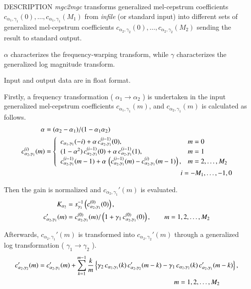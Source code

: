\begin{qsection}{DESCRIPTION}
{\em mgc2mgc} transforms generalized mel-cepstrum coefficients
$c_{\alpha_1,\gamma_1}(0),\dots,c_{\alpha_1,\gamma_1}(M_1)$
from {\em infile} (or standard input) 
into different sets of generalized mel-cepstrum coefficients
$c_{\alpha_2,\gamma_2}(0),\dots,c_{\alpha_2,\gamma_2}(M_2)$
sending the result to standard output.

$\alpha$ characterizes the frequency-warping transform,
while $\gamma$ characterizes the generalized log magnitude transform.

Input and output data are in float format.

Firstly, a frequency transformation ( $\alpha_1 \rightarrow \alpha_2$ )
is undertaken in the input generalized mel-cepstrum
coefficients $c_{\alpha_1,\gamma_1}(m)$,
and $c_{\alpha_2,\gamma_1}(m)$ is calculated as follows.
\begin{align} 
\alpha &= (\alpha_2-\alpha_1)/(1-\alpha_1\alpha_2) \notag \\
c_{\alpha_2,\gamma_1}^{(i)}(m) &= \begin{cases}
          \;\; c_{\alpha_1,\gamma_1}(-i)
	    +\alpha\,c_{\alpha_2,\gamma_1}^{(i-1)}(0), &  m=0 \\
          \;\; (1-\alpha^2)\,c_{\alpha_2,\gamma_1}^{(i-1)}(0)
            +\alpha\,c_{\alpha_2,\gamma_1}^{(i-1)}(1), &  m=1 \\
          \;\; c_{\alpha_2,\gamma_1}^{(i-1)}(m-1) 
	    +\alpha\, \left(c_{\alpha_2,\gamma_1}^{(i-1)}(m)
	    -c_{\alpha_2,\gamma_1}^{(i)}(m-1)\right), &   m=2,\dots,M_2
         \end{cases} \notag \\
&\hspace{70mm} i = -M_1,\dots,-1,0 \notag
\end{align}

Then the gain is normalized and $c_{\alpha_2,\gamma_1}'(m)$ 
is evaluated.
\begin{align}
K_{\alpha_2} &= 
	s_{\gamma_1}^{-1}\left(c_{\alpha_2,\gamma_1}^{(0)}(0)\right), \notag \\ 
c_{\alpha_2,\gamma_1}'(m) &=
          c_{\alpha_2,\gamma_1}^{(0)}(m)/\left(1+\gamma_1\,
	  c_{\alpha_2,\gamma_1}^{(0)}(0)\right), \qquad m = 1,2,\dots, M_2 \notag
\end{align}

Afterwards, $c_{\alpha_2,\gamma_1}'(m)$ is transformed into 
$c_{\alpha_2,\gamma_2}'(m)$ through a generalized log transformation
( $\gamma_1 \rightarrow \gamma_2$ ).
\begin{align}
c_{\alpha_2,\gamma_2}'(m) &=
        c_{\alpha_2,\gamma_1}'(m)+\sum_{k=1}^{m-1} \frac{k}{m}
          \left\{ \gamma_2\,c_{\alpha_2,\gamma_1}(k)\,
	  c_{\alpha_2,\gamma_2}'(m-k) 
 -\gamma_1\,c_{\alpha_2,\gamma_2}(k)\,
          c_{\alpha_2,\gamma_1}'(m-k) \right\},  \notag \\
	  &\hspace{70mm} m = 1, 2, \dots, M_2 \notag
\end{align}


\end{qsection}

